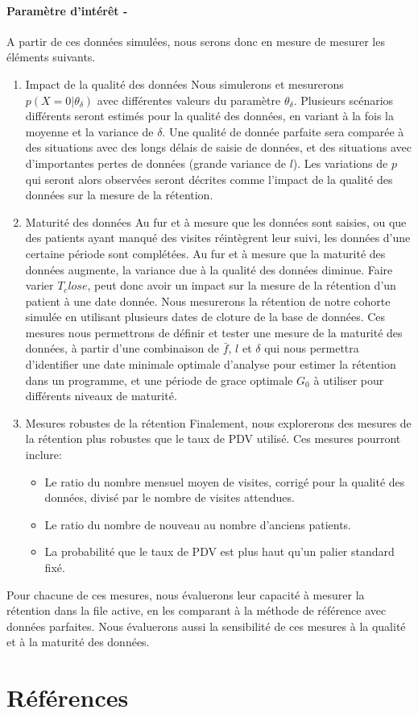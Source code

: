 \documentclass[paper=a4, fontsize=11pt]{scrartcl}
\numberwithin{equation}{section}		%
\numberwithin{figure}{section}			%
\numberwithin{table}{section}				%
\begin{document}
\paragraph{Paramètre d'intérêt - }A partir de ces données simulées, nous serons donc en mesure de mesurer les éléments suivants.
\begin{enumerate}
\item{Impact de la qualité des données} Nous simulerons et mesurerons $ p(X = 0 | \theta_{\delta})$ avec différentes valeurs du paramètre $\theta_{\delta}$. Plusieurs scénarios différents seront estimés pour la qualité des données, en variant à la fois la moyenne et la variance de $\delta$. Une qualité de donnée parfaite sera comparée à des situations avec des longs délais de saisie de données, et des situations avec d'importantes pertes de données (grande variance de $l$). Les variations de $p$  qui seront alors observées seront décrites comme l'impact de la qualité des données sur la mesure de la rétention.

\item{Maturité des données} Au fur et à mesure que les données sont saisies, ou que des patients ayant manqué des visites réintègrent leur suivi, les données d'une certaine période sont complétées. Au fur et à mesure que la maturité des données augmente, la variance due à la qualité des données diminue. Faire varier $T_close$, peut donc avoir un impact sur la mesure de la rétention d'un patient à une date donnée. Nous mesurerons la rétention de notre cohorte simulée en utilisant plusieurs dates de cloture de la base de données. Ces mesures nous permettrons de définir et tester une mesure de la maturité des données, à partir d'une combinaison de  $\bar{f}$, $l$ et $\delta$ qui nous permettra d'identifier une date minimale optimale d'analyse pour estimer la rétention dans un programme, et une période de grace optimale $G_0$ à utiliser pour différents niveaux de maturité.

\item{Mesures robustes de la rétention} Finalement, nous explorerons des mesures de la rétention plus robustes que le taux de PDV utilisé. Ces mesures pourront inclure:
\begin{itemize}
	\item Le ratio du nombre mensuel moyen de visites, corrigé pour la qualité des données, divisé par le nombre de visites attendues.
	\item Le ratio du nombre de nouveau au nombre d'anciens patients.
	\item La probabilité que le taux de PDV est plus haut qu'un palier standard fixé.
\end{itemize}
\end{enumerate}

Pour chacune de ces mesures, nous évaluerons leur capacité à mesurer la rétention dans la file active, en les comparant à la méthode de référence avec données parfaites. Nous évaluerons aussi la sensibilité de ces mesures à la qualité et à la maturité des données.

\section{Références}

\end{document}
